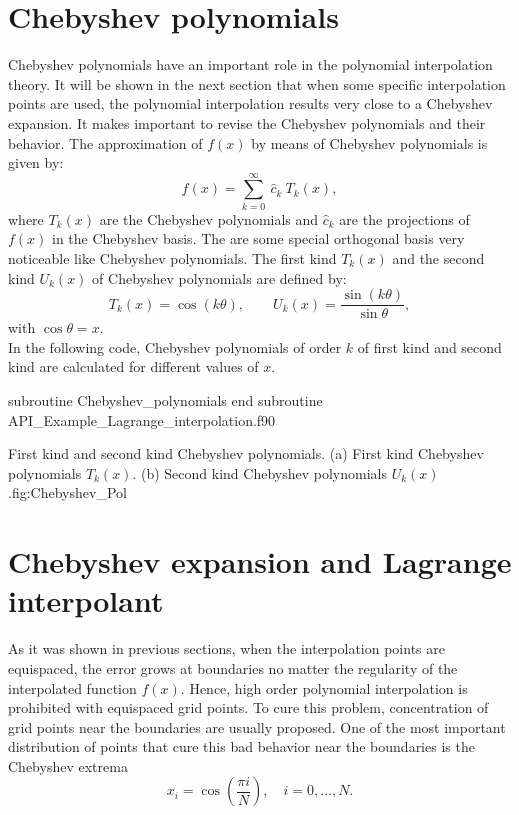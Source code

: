 \section{Chebyshev polynomials} 
Chebyshev polynomials have an important role in the polynomial interpolation theory. It will be shown in the next section that when some specific interpolation  points are used, the polynomial interpolation results very close to a Chebyshev expansion. It makes important to revise the Chebyshev polynomials and their behavior. 
The approximation of $ f(x) $ by means of Chebyshev polynomials is given by:  
$$
    f(x) = \sum_{k=0} ^{ \infty} \  \hat{c}_k \ T_k (x), 
$$
where $ T_k(x) $ are the Chebyshev polynomials and  $ \hat{c}_k $ are the projections of $ f(x) $ in the Chebyshev basis. 
The are some special orthogonal basis very noticeable like Chebyshev polynomials. The  first kind $ T_k(x) $ and the second kind $ U_k(x) $ of
Chebyshev polynomials are defined by:  
$$ 
   T_k (x) = \cos( k \theta),  \qquad  U_k (x) = \frac{ \sin( k \theta) } { \sin \theta },
$$
with $ \cos  \theta = x$.\\

 
In the following code, Chebyshev polynomials of order $ k$ of first kind and second kind are calculated for different values  of $ x$. 

{subroutine Chebyshev_polynomials}
{end subroutine}
{API_Example_Lagrange_interpolation.f90}


\twographs
{  }{ }
{ First kind and second kind Chebyshev polynomials. (a) First kind Chebyshev polynomials $T_k(x)$. (b) Second kind Chebyshev polynomials $U_k(x)$.}{fig:Chebyshev_Pol}
\FloatBarrier  


\section{Chebyshev expansion and Lagrange interpolant} 
As it was shown in previous sections, when the interpolation points are equispaced, the error grows at boundaries no matter the regularity of the interpolated function $f(x)$.  Hence, high order polynomial  interpolation is prohibited with equispaced grid points. 
To cure this problem, concentration of grid points near the boundaries are usually proposed. 
One of the most important distribution of points that cure this bad behavior near the boundaries is the Chebyshev extrema
$$
   x_i = \cos \left( \frac{ \pi i  }{ N }  \right) , \quad i=0, \ldots, N.
$$

